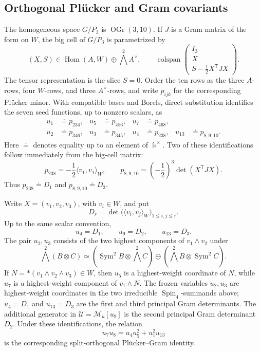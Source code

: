 \documentclass[11pt,reqno]{amsart}
\numberwithin{equation}{section}
\theoremstyle{remark}
\newcommand{\kk}{\Bbbk}
\newcommand{\UR}{\mathscr U}
\newcommand{\Mu}{\mathcal M_u}
\newcommand{\Sym}{\operatorname{Sym}}
\begin{document}
\subsection{Orthogonal Pl\"ucker and Gram covariants}

The homogeneous space $G/P_3$ is $\operatorname{OGr}(3,10)$.  If $J$
is a Gram matrix of the form on $W$, the big cell of $G/P_3$ is parametrized by
\[
 (X,S)\in\operatorname{Hom}(A,W)\oplus\bigwedge^2A^\vee,
 \qquad
 \operatorname{colspan}
 \begin{pmatrix}
 I_3\\ X\\ S-\frac12X^{\mathsf T}JX
 \end{pmatrix}.
\]
The tensor representation is the slice $S=0$.  Order the ten rows as the
three $A$-rows, four $W$-rows, and three $A^\vee$-rows, and write
$p_{ijk}$ for the corresponding Pl\"ucker minor.  With compatible bases
and Borels, direct substitution identifies the seven seed functions, up to
nonzero scalars, as
\[
\begin{aligned}
 u_1&\doteq p_{234},&u_5&\doteq p_{456},&u_7&\doteq p_{468},\\
 u_2&\doteq p_{346},&u_3&\doteq p_{345},&u_4&\doteq p_{238},&
 u_{13}&\doteq p_{8,9,10}.
\end{aligned}
\]
Here $\doteq$ denotes equality up to an element of $\kk^\times$.  Two of
these identifications follow immediately from the big-cell matrix:
\[ p_{238}=-\frac12\langle v_1,v_1\rangle_W,\qquad p_{8,9,10}=\left(-\frac12\right)^3\det(X^{\mathsf T}JX). \]
Thus $p_{238}\doteq D_1$ and $p_{8,9,10}\doteq D_3$.

Write $X=(v_1,v_2,v_3)$, with $v_i\in W$, and put
\[ D_r=\det\bigl(\langle v_i,v_j\rangle_W\bigr)_{1\le i,j\le r}. \]
Up to the same scalar convention,
\[ u_4=D_1,\qquad u_9=D_2,\qquad u_{13}=D_3. \]
The pair $u_2,u_3$ consists of the two highest components of
$v_1\wedge v_2$ under
\[ \bigwedge^2(B\otimes C) \simeq (\Sym^2B\otimes\bigwedge^2C) \oplus(\bigwedge^2B\otimes\Sym^2C). \]
If $N=*(v_1\wedge v_2\wedge v_3)\in W$, then $u_5$ is a
highest-weight coordinate of $N$, while $u_7$ is a highest-weight
component of $v_1\wedge N$.  The frozen variables $u_2,u_3$ are
highest-weight coordinates in the two irreducible
$\operatorname{Spin}_4$-summands above; $u_4=D_1$ and $u_{13}=D_3$
are the first and third principal Gram determinants.  The additional
generator in $\UR=\Mu[u_9]$ is the second principal Gram determinant
$D_2$.  Under these identifications, the relation
\[ u_7u_8=u_4u_5^2+u_1^2u_{13} \]
is the corresponding split-orthogonal Pl\"ucker--Gram identity.
\end{document}
